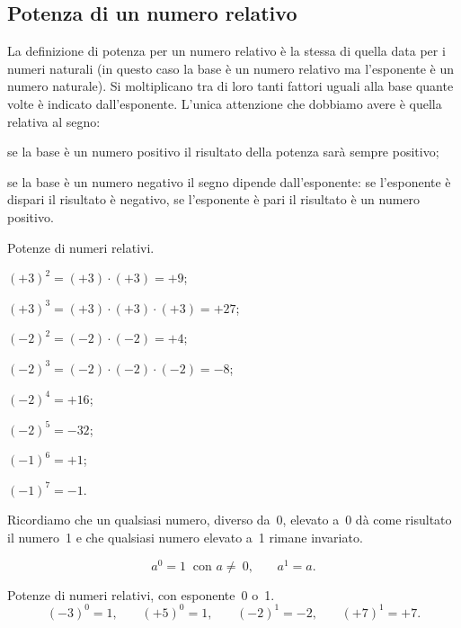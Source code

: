 \ovalbox{\risolvii \ref{ese:2.19}, \ref{ese:2.20}, \ref{ese:2.21}}

\subsection{Potenza di un numero relativo}

La definizione di potenza per un numero relativo è la stessa di quella data per i numeri naturali
(in questo caso la base è un numero relativo ma l'esponente è un numero naturale).
Si moltiplicano tra di loro tanti fattori uguali alla base quante volte è indicato dall'esponente.
L'unica attenzione che dobbiamo avere è quella relativa al segno:
 \begin{itemize*}
 \item se la base è un numero positivo il risultato della potenza sarà sempre positivo;
 \item se la base è un numero negativo il segno dipende dall'esponente: se l'esponente è dispari il
risultato è negativo, se l'esponente è pari il risultato è un numero positivo.
 \end{itemize*}

\begin{exrig}
 \begin{esempio}
 Potenze di numeri relativi.
 \begin{itemize*}
 \item $(+3)^2=(+3)\cdot(+3)=+9$;
 \item $(+3)^3=(+3)\cdot(+3)\cdot(+3)=+27$;
 \item $(-2)^2=(-2)\cdot(-2)=+4$;
 \item $(-2)^3=(-2)\cdot(-2)\cdot(-2)=-8$;
 \item $(-2)^4=+16$;
 \item $(-2)^5=-32$;
 \item $(-1)^6=+1$;
 \item $(-1)^7=-1$.
 \end{itemize*}

 \end{esempio}

\end{exrig}

Ricordiamo che un qualsiasi numero, diverso da~0, elevato a~0 dà come risultato il numero~1 e che qualsiasi
numero elevato a~1 rimane invariato.

\[a^0=1\:\text{ con }a\neq~0\text{,}\qquad a^1=a.\]

 \begin{exrig}
 \begin{esempio}
 Potenze di numeri relativi, con esponente~0 o~1.
\[(-3)^0=1\text{,}\qquad (+5)^0=1\text{,}\qquad (-2)^1=-2\text{,}\qquad (+7)^1=+7.\]
 \end{esempio}

\end{exrig}

